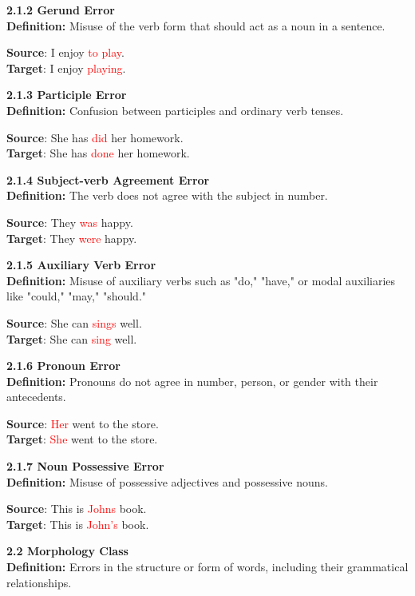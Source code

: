 \begin{tcolorbox}[breakable]
\noindent \textbf{2.1.2 Gerund Error}\\
\textbf{Definition:} Misuse of the verb form that should act as a noun in a sentence.


\textbf{Source}: I enjoy \textcolor{red}{to play}. \\
\textbf{Target}: I enjoy \textcolor{red}{playing}.


\noindent \textbf{2.1.3 Participle Error}\\
\textbf{Definition:} Confusion between participles and ordinary verb tenses.


\textbf{Source}: She has \textcolor{red}{did} her homework. \\
\textbf{Target}: She has \textcolor{red}{done} her homework.


\noindent \textbf{2.1.4 Subject-verb Agreement Error}\\
\textbf{Definition:} The verb does not agree with the subject in number.


\textbf{Source}: They \textcolor{red}{was} happy. \\
\textbf{Target}: They \textcolor{red}{were} happy.


\noindent \textbf{2.1.5 Auxiliary Verb Error}\\
\textbf{Definition:} Misuse of auxiliary verbs such as "do," "have," or modal auxiliaries like "could," "may," "should."


\textbf{Source}: She can \textcolor{red}{sings} well. \\
\textbf{Target}: She can \textcolor{red}{sing} well.


\noindent \textbf{2.1.6 Pronoun Error}\\
\textbf{Definition:} Pronouns do not agree in number, person, or gender with their antecedents.


\textbf{Source}: \textcolor{red}{Her} went to the store. \\
\textbf{Target}: \textcolor{red}{She} went to the store.


\noindent \textbf{2.1.7 Noun Possessive Error}\\
\textbf{Definition:} Misuse of possessive adjectives and possessive nouns.


\textbf{Source}: This is \textcolor{red}{Johns} book. \\
\textbf{Target}: This is \textcolor{red}{John's} book.


\noindent \textbf{2.2 Morphology Class}\\
\textbf{Definition:} Errors in the structure or form of words, including their grammatical relationships.


\end{tcolorbox}
